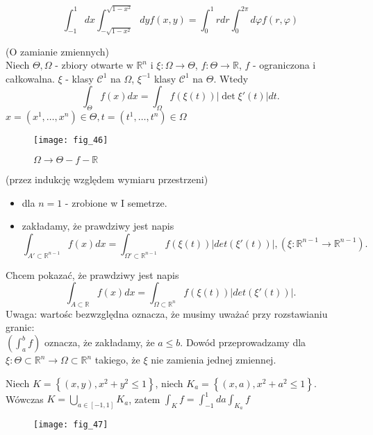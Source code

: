 \documentclass[../main.tex]{subfiles}
\begin{document}
    \begin{equation}
        \int_{-1}^{1}dx\int_{-\sqrt{1-x^2} }^{\sqrt{1-x^2} }dy f(x,y) = \int_0^1 r dr \int_0^{2\pi} d\varphi f(r,\varphi)
    \end{equation}
    \begin{tw}
        (O zamianie zmiennych)\\
        Niech $\Theta, \Omega$ - zbiory otwarte w $\mathbb{R}^n$ i $\xi: \Omega\to \Theta$, $f: \Theta\to \mathbb{R}$, $f$ - ograniczona i całkowalna. $\xi$ - klasy $\mathcal{C}^1$ na $\Omega$, $\xi^{-1}$ klasy $\mathcal{C}^{1}$ na $\Theta$. Wtedy
        \begin{equation}
            \int_{\Theta} f(x) dx =  \int_{\Omega} f(\xi(t)) | \det \xi'(t) | dt.
        \end{equation}
        $x=(x^1,\ldots,x^n)\in \Theta, t=(t^1,\ldots,t^n)\in \Omega$
    \end{tw}
    \begin{figure}[h]
        \centering
        \texttt{[image: fig\_46]}
        \caption{$\Omega\to\Theta - f - \mathbb{R}$}
    \end{figure}
    \begin{dowod}
        (przez indukcję względem wymiaru przestrzeni)\\
        \begin{itemize}
            \item dla $n=1$ - zrobione w I semetrze.
            \item zakładamy, że prawdziwy jest napis
                \[
                    \int_{A'\subset\mathbb{R}^{n-1}} f(x)dx = \int_{\Omega' \subset\mathbb{R}^{n-1}} f(\xi(t)) | det(\xi'(t)) |, (\xi: \mathbb{R}^{n-1}\to \mathbb{R}^{n-1})
                .\]
        \end{itemize}
        Chcem pokazać, że prawdziwy jest napis
        \[
            \int_{A\subset\mathbb{R}} f(x) dx = \int_{\Omega \subset \mathbb{R}^n} f(\xi(t)) | det(\xi'(t)) |
        .\]
        Uwaga: wartośc bezwzględna oznacza, że musimy uważać przy rozstawianiu granic:\\
        $\left( \int_a^b f \right) $ oznacza, że zakładamy, że $a\le b$. Dowód przeprowadzamy dla $\xi: \Theta\subset\mathbb{R}^n\to \Omega\subset\mathbb{R}^n$ takiego, że $\xi$ nie zamienia jednej zmiennej.
        \begin{obserwacja}
            Niech $K = \left\{ (x,y), x^2+y^2 \le 1 \right\} $, niech $K_a = \left\{ (x,a), x^2+a^2 \le 1 \right\}.$\\
            Wówczas $K = \bigcup_{a\in[-1,1]}K_a$, zatem $\int_K f = \int_{-1}^1 da \int _{K_a} f$

        \end{obserwacja}

    \begin{figure}[h]
        \centering
        \texttt{[image: fig\_47]}
    \end{figure}

    \end{dowod}
\end{document}
